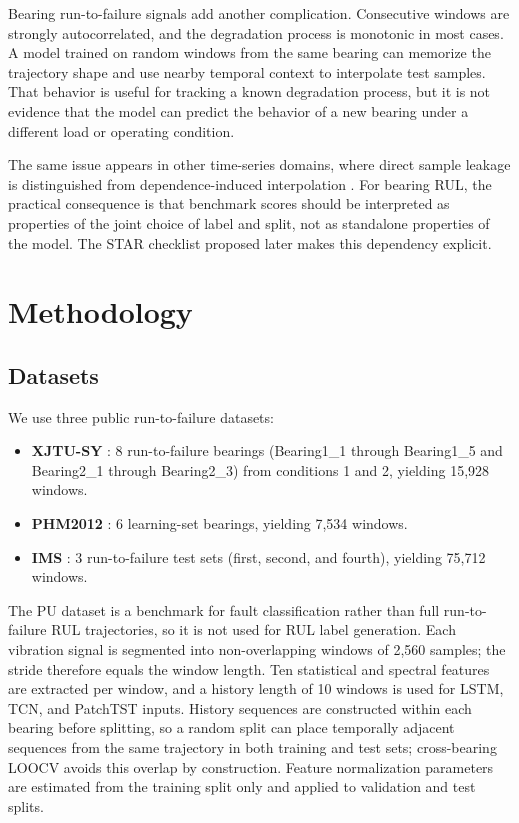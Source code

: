 \documentclass[pdflatex,sn-mathphys-num]{sn-jnl}
\begin{document}
Bearing run-to-failure signals add another complication. Consecutive windows are strongly autocorrelated, and the degradation process is monotonic in most cases. A model trained on random windows from the same bearing can memorize the trajectory shape and use nearby temporal context to interpolate test samples. That behavior is useful for tracking a known degradation process, but it is not evidence that the model can predict the behavior of a new bearing under a different load or operating condition.

The same issue appears in other time-series domains, where direct sample leakage is distinguished from dependence-induced interpolation \cite{leakage_nature,leakage_frontiers}. For bearing RUL, the practical consequence is that benchmark scores should be interpreted as properties of the joint choice of label and split, not as standalone properties of the model. The STAR checklist proposed later makes this dependency explicit.

\section{Methodology}
\subsection{Datasets}
We use three public run-to-failure datasets:
\begin{itemize}
    \item \textbf{XJTU-SY} \cite{xjtusy2019dataset}: 8 run-to-failure bearings (Bearing1\_1 through Bearing1\_5 and Bearing2\_1 through Bearing2\_3) from conditions 1 and 2, yielding 15,928 windows.
    \item \textbf{PHM2012} \cite{nectoux2012pronostia}: 6 learning-set bearings, yielding 7,534 windows.
    \item \textbf{IMS} \cite{ims2006}: 3 run-to-failure test sets (first, second, and fourth), yielding 75,712 windows.
\end{itemize}
The PU dataset is a benchmark for fault classification rather than full run-to-failure RUL trajectories, so it is not used for RUL label generation. Each vibration signal is segmented into non-overlapping windows of 2,560 samples; the stride therefore equals the window length. Ten statistical and spectral features are extracted per window, and a history length of 10 windows is used for LSTM, TCN, and PatchTST inputs. History sequences are constructed within each bearing before splitting, so a random split can place temporally adjacent sequences from the same trajectory in both training and test sets; cross-bearing LOOCV avoids this overlap by construction. Feature normalization parameters are estimated from the training split only and applied to validation and test splits.
\end{document}
